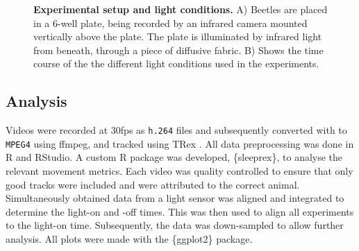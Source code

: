 \begin{figure}[t!]
    \caption{\textbf{Experimental setup and light conditions.} A) Beetles are placed in a 6-well plate, being recorded by an infrared camera mounted vertically above the plate. The plate is illuminated by infrared light from beneath, through a piece of diffusive fabric. B) Shows the time course of the the different light conditions used in the experiments.}
\end{figure}





\subsection{Analysis}
Videos were recorded at 30fps as \lstinline{h.264} files and subsequently converted with to \lstinline{MPEG4} using ffmpeg, and tracked using TRex \citep{Walter2021a}. 
All data preprocessing was done in R and RStudio. A custom R package was developed, \{sleeprex\}, to analyse the relevant movement metrics. Each video was quality controlled to ensure that only good tracks were included and were attributed to the correct animal. Simultaneously obtained data from a light sensor was aligned and integrated to determine the light-on and -off times. This was then used to align all experiments to the light-on time. Subsequently, the data was down-sampled to allow further analysis. All plots were made with the \{ggplot2\} package.






